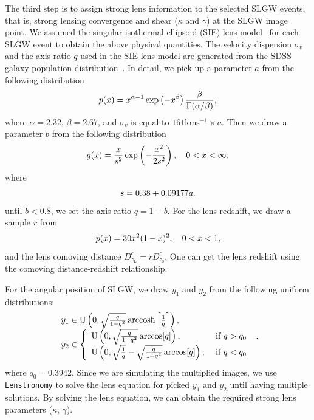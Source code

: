 \documentclass[fleqn,usenatbib]{mnras}
\begin{document}
The third step is to assign strong lens information to the selected SLGW events, that is, strong lensing convergence and shear ($\kappa$ and $\gamma$) at the SLGW image point.
We assumed the singular isothermal ellipsoid (SIE) lens model~\citep{1994A&A...284..285K} for each SLGW event to obtain the above physical quantities.
The velocity dispersion $\sigma_v$ and the axis ratio $q$ used in the SIE lens model are generated from the SDSS galaxy population distribution~\citep{2015ApJ...811...20C, Haris:2018vmn, Wierda:2021upe}. 
In detail, we pick up a parameter $a$ from the following distribution
\begin{equation}
p(x)=x^{\alpha-1} \exp \left(-x^{\beta}\right) \frac{\beta}{\Gamma(\alpha / \beta)} \\,
\end{equation}
where $\alpha=2.32$, $\beta=2.67$, and $\sigma_v$ is equal to $161 \mathrm{km s^{-1}} \times a$.
Then we draw a parameter $b$ from the following distribution
\begin{equation}
g(x)=\frac{x}{s^{2}} \exp \left(-\frac{x^{2}}{2 s^{2}}\right), \quad 0<x<\infty \\,
\end{equation}
where 
\begin{equation}
s=0.38+0.09177 a \\.
\end{equation}
until $b < 0.8$, we set the axis ratio $q = 1 - b$.
For the lens redshift, we draw a sample $r$ from
\begin{equation}
p(x)=30 x^{2}(1-x)^{2}, \quad 0<x<1 \\,
\end{equation}
and the lens comoving distance $D^c_{z_\mathrm{L}} = rD^c_{z_\mathrm{s}}$.
One can get the lens redshift using the comoving distance-redshift relationship.

For the angular position of SLGW, we draw $y_1$ and $y_2$ from the following uniform distributions:
\begin{equation}
\begin{array}{l}y_{1} \in \mathrm{U}\left(0, \sqrt{\frac{q}{1-q^{2}}} \operatorname{arccosh}\left[\frac{1}{q}\right]\right), \\ y_{2} \in \left\{\begin{array}{ll} \mathrm{U}\left(0, \sqrt{\frac{q}{1-q^{2}}} \arccos [q]\right), & \text { if } q>q_{0} \\ \mathrm{U}\left(0, \sqrt{\frac{1}{q}}-\sqrt{\frac{q}{1-q^{2}}} \arccos [q]\right), & \text { if } q<q_{0}\end{array}\right.\end{array} \\,
\end{equation}
where $q_0=0.3942$.
Since we are simulating the multiplied images, we use \texttt{Lenstronomy} to solve the lens equation for picked $y_1$ and $y_2$ until having multiple solutions.
By solving the lens equation, we can obtain the required strong lens parameters ($\kappa$, $\gamma$).
\end{document}
